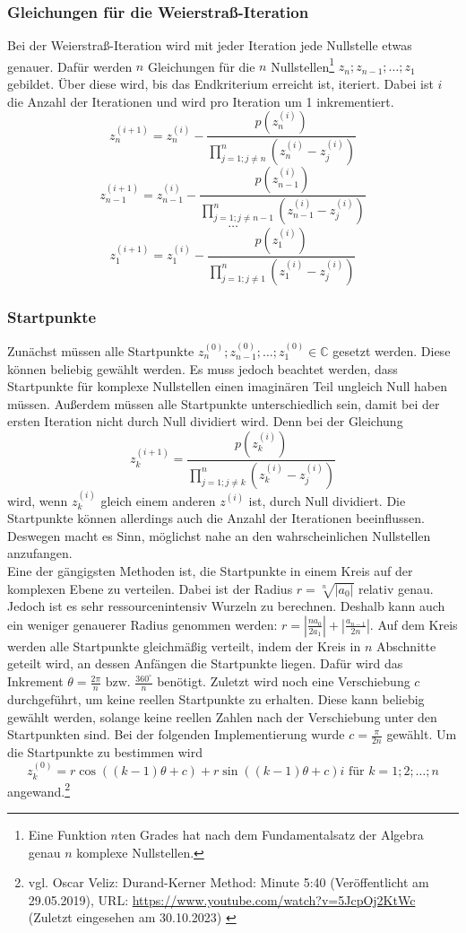 \documentclass[12pt]{article}
\begin{document}
\subsubsection{Gleichungen für die Weierstraß-Iteration}
Bei der Weierstraß-Iteration wird mit jeder Iteration jede Nullstelle etwas genauer. Dafür werden $n$ Gleichungen für die $n$ Nullstellen\footnote{Eine Funktion $n$ten Grades hat nach dem Fundamentalsatz der Algebra genau $n$ komplexe Nullstellen.} $z_n;z_{n-1};\dots;z_1$ gebildet. Über diese wird, bis das Endkriterium erreicht ist, iteriert. Dabei ist $i$ die Anzahl der Iterationen und wird pro Iteration um 1 inkrementiert.
\[z_n^{(i+1)} = z_n^{(i)} - \frac{p(z_n^{(i)})}{\prod_{j=1;j\neq n}^{n}(z_n^{(i)}-z_j^{(i)})}\]
\[z_{n-1}^{(i+1)} = z_{n-1}^{(i)} - \frac{p(z_{n-1}^{(i)})}{\prod_{j=1;j\neq n-1}^{n}(z_{n-1}^{(i)}-z_j^{(i)})}\]
\vspace{0.25mm}
\[\dots\]
\[z_{1}^{(i+1)} = z_1^{(i)} - \frac{p(z_{1}^{(i)})}{\prod_{j=1;j\neq 1}^{n}(z_{1}^{(i)}-z_j^{(i)})}\]
\subsubsection{Startpunkte}
Zunächst müssen alle Startpunkte $z_n^{(0)};z_{n-1}^{(0)};\dots;z_1^{(0)} \in \mathbb{C}$ gesetzt werden. Diese können beliebig gewählt werden. Es muss jedoch beachtet werden, dass Startpunkte für komplexe Nullstellen einen imaginären Teil ungleich Null haben müssen. Außerdem müssen alle Startpunkte unterschiedlich sein, damit bei der ersten Iteration nicht durch Null dividiert wird. Denn bei der Gleichung
\begin{equation*}
    z_k^{(i+1)} = \frac{p(z_{k}^{(i)})}{\prod_{j=1;j\neq k}^{n}(z_{k}^{(i)}-z_j^{(i)})}
\end{equation*}
wird, wenn $z_{k}^{(i)}$ gleich einem anderen $z^{(i)}$ ist, durch Null dividiert.
Die Startpunkte können allerdings auch die Anzahl der Iterationen beeinflussen. Deswegen macht es Sinn, möglichst nahe an den wahrscheinlichen Nullstellen anzufangen.\\
Eine der gängigsten Methoden ist, die Startpunkte in einem Kreis auf der komplexen Ebene zu verteilen. Dabei ist der Radius $r = \sqrt[n]{|a_0|}$ relativ genau. Jedoch ist es sehr ressourcenintensiv Wurzeln zu berechnen. Deshalb kann auch ein weniger genauerer Radius genommen werden: $r = |\frac{na_0}{2a_1}| + |\frac{a_{n-1}}{2n}|$.
Auf dem Kreis werden alle Startpunkte gleichmäßig verteilt, indem der Kreis in $n$ Abschnitte geteilt wird, an dessen Anfängen die Startpunkte liegen. Dafür wird das Inkrement $\theta = \frac{2\pi}{n} \text{ bzw. } \frac{360^\circ}{n}$ benötigt. Zuletzt wird noch eine Verschiebung $c$ durchgeführt, um keine reellen Startpunkte zu erhalten. Diese kann beliebig gewählt werden, solange keine reellen Zahlen nach der Verschiebung unter den Startpunkten sind. Bei der folgenden Implementierung wurde $c = \frac{\pi}{2n}$ gewählt.
Um die Startpunkte zu bestimmen wird 
\[z_{k}^{(0)} = r\cos((k-1)\theta+c)+r\sin((k-1)\theta+c)i \text{ für } k=1;2;\dots;n\]
angewand.\footnote{
    vgl. Oscar Veliz: Durand-Kerner Method: Minute 5:40 (Veröffentlicht am 29.05.2019), URL: \url{https://www.youtube.com/watch?v=5JcpOj2KtWc} (Zuletzt eingesehen am 30.10.2023) \label{ftn:OscarVilez,5:40}
}
\end{document}

